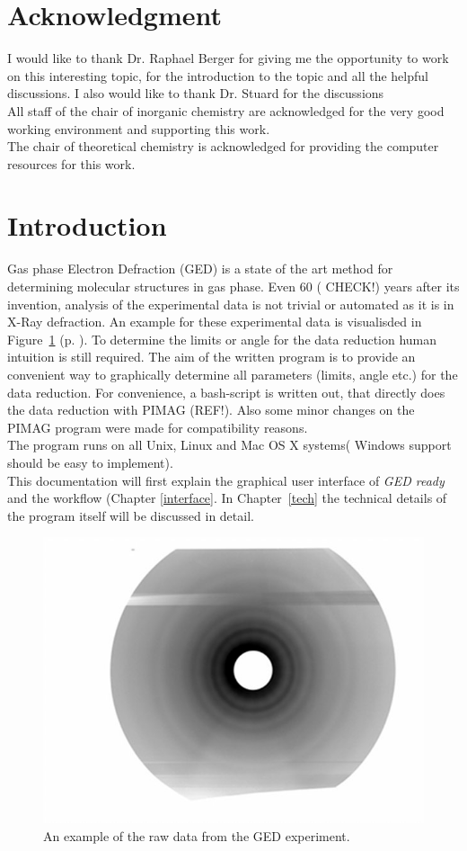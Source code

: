 \section*{Acknowledgment}
I would like to thank Dr. Raphael Berger for giving me the opportunity to work on this interesting topic, for the introduction to the topic and all the helpful discussions. I also would like to thank Dr. Stuard for the discussions \\
All staff of the chair of inorganic chemistry are acknowledged for the very good working  environment and supporting this work. \\
The chair of theoretical chemistry is acknowledged for providing the computer resources for this work. 
\newpage



\section{Introduction}
Gas phase Electron Defraction  (GED) is a state of the art method for determining molecular structures in gas phase. Even 60 ( CHECK!) years after its invention, analysis of the experimental data is not trivial or automated as it is in X-Ray defraction. An example for these experimental data is visualisded in Figure~\ref{example} (p. \pageref{exaple}). To determine the limits or angle for the data reduction human intuition is still required. The aim of the written program is to provide an convenient way to graphically determine all parameters (limits, angle etc.) for the data reduction. For convenience, a bash-script is written out, that directly does the data reduction with PIMAG (REF!). Also some minor changes on the PIMAG program were made for compatibility reasons. \\
The program runs on all Unix, Linux and Mac OS X systems( Windows support should be easy to implement). \\
This documentation will first explain the graphical user interface of \textit{GED ready} and the workflow (Chapter \ref{interface}. In Chapter~\ref{tech} the technical details of the program itself will be discussed in detail. 
 
\begin{figure}
\includegraphics[width=12cm]{example}
\caption{An example of the raw data from the GED experiment.}
\label{example} 
\end{figure} 


 